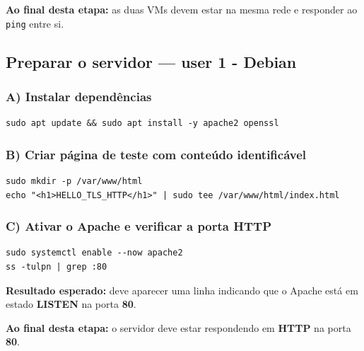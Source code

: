 \begin{notebox}
\textbf{Ao final desta etapa:} as duas VMs devem estar na mesma rede e responder ao \texttt{ping} entre si.
\end{notebox}

\subsection{Preparar o servidor --- user 1 - Debian}

\subsubsection*{A) Instalar dependências}

\begin{lstlisting}
sudo apt update && sudo apt install -y apache2 openssl
\end{lstlisting}


\subsubsection*{B) Criar página de teste com conteúdo identificável}

\begin{lstlisting}
sudo mkdir -p /var/www/html
echo "<h1>HELLO_TLS_HTTP</h1>" | sudo tee /var/www/html/index.html
\end{lstlisting}


\subsubsection*{C) Ativar o Apache e verificar a porta HTTP}

\begin{lstlisting}
sudo systemctl enable --now apache2
ss -tulpn | grep :80
\end{lstlisting}

\begin{notebox}
\textbf{Resultado esperado:} deve aparecer uma linha indicando que o Apache está em estado \textbf{LISTEN} na porta \textbf{80}.
\end{notebox}


\begin{notebox}
\textbf{Ao final desta etapa:} o servidor deve estar respondendo em \textbf{HTTP} na porta \textbf{80}.
\end{notebox}

